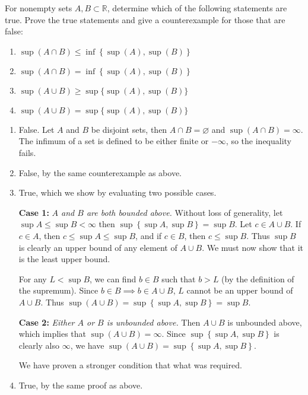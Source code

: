 \documentclass[10pt]{amsart}
\theoremstyle{plain}
\newenvironment{exercise}[1]{%
  \renewcommand\themanualtheoreminner{#1}%
  \manualtheoreminner
}{\endmanualtheoreminner}
\theoremstyle{definition}
\newcommand{\<}{\langle}
\renewcommand{\>}{\rangle}
\begin{document}
\begin{exercise}{1.8}
	For nonempty sets $A,B \subset \mathbb{R}$, determine which of the following statements are true. Prove the true statements and give a counterexample for those that are false:
	\begin{enumerate}
		\item $\sup(A \cap B) \leq \inf\left\{ \sup(A), \sup(B) \right\}$
		\item $\sup(A \cap B) = \inf\left\{ \sup(A), \sup(B) \right\}$
		\item $\sup(A \cup B) \geq \sup\{\sup(A), \sup(B)\}$
		\item $\sup(A \cup B) = \sup\{\sup(A), \sup(B)\}$
	\end{enumerate}
\end{exercise}
\begin{enumerate}
	\item
		False. Let $A$ and $B$ be disjoint sets, then $A \cap B = \varnothing$ and $\sup(A \cap B) = \infty$. The infimum of a set is defined to be either finite or $-\infty$, so the inequality fails.
	\item
		False, by the same counterexample as above.
	\item
		True, which we show by evaluating two possible cases.
		
		\textbf{Case 1:} \textit{$A$ and $B$ are both bounded above.} Without loss of generality, let $\sup A \leq \sup B < \infty$ then $\sup\left\{ \sup A, \sup B \right\}=\sup B$. Let $c \in A \cup B$. If $c \in A$, then $c \leq \sup A \leq \sup B$, and if $c \in B$, then $c \leq \sup B$. Thus $\sup B$ is clearly an upper bound of any element of $A \cup B$. We must now show that it is the least upper bound.

		For any $L < \sup B$, we can find $b \in B$ such that $b > L$ (by the definition of the supremum). Since $b \in B \implies b \in A \cup B$, $L$ cannot be an upper bound of $A \cup B$. Thus $\sup(A \cup B) = \sup\left\{ \sup A, \sup B \right\} = \sup B$.

		\textbf{Case 2:} \textit{Either $A$ or $B$ is unbounded above.} Then $A \cup B$ is unbounded above, which implies that $\sup(A \cup B) = \infty$. Since $\sup\left\{ \sup A, \sup B \right\}$ is clearly also $\infty$, we have $\sup(A \cup B) = \sup \left\{ \sup A, \sup B \right\}$.

		We have proven a stronger condition that what was required.
	\item
		True, by the same proof as above.
\end{enumerate}
\end{document}
